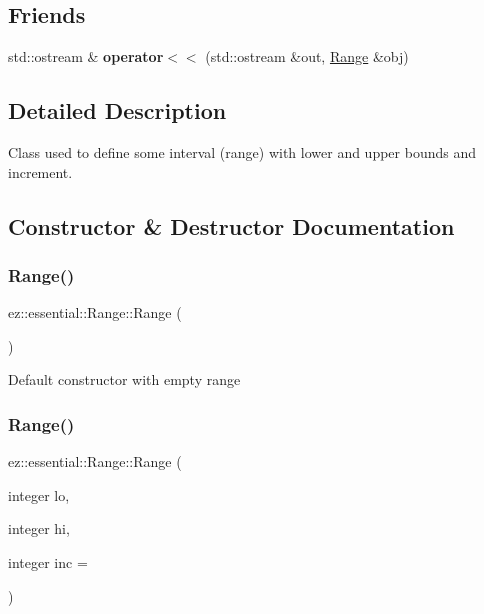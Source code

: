 \subsection*{Friends}
\begin{DoxyCompactItemize}
\item 
\mbox{\label{classez_1_1essential_1_1Range_a55300c5f660a81fcaf9da6c888573913}} 
std\+::ostream \& {\bfseries operator$<$$<$} (std\+::ostream \&out, \hyperlink{classez_1_1essential_1_1Range}{Range} \&obj)
\end{DoxyCompactItemize}


\subsection{Detailed Description}
Class used to define some interval (range) with lower and upper bounds and increment. 

\subsection{Constructor \& Destructor Documentation}
\mbox{\label{classez_1_1essential_1_1Range_ae594ee2956dd1baf07e78d988a51da29}} 
\subsubsection{\texorpdfstring{Range()}{Range()}\hspace{0.1cm}{\footnotesize\ttfamily [1/3]}}
{\footnotesize\ttfamily ez\+::essential\+::\+Range\+::\+Range (\begin{DoxyParamCaption}{ }\end{DoxyParamCaption})\hspace{0.3cm}{\ttfamily [inline]}}

Default constructor with empty range \mbox{\label{classez_1_1essential_1_1Range_ac13f4357a3e32efad65877d279edcb41}} 
\subsubsection{\texorpdfstring{Range()}{Range()}\hspace{0.1cm}{\footnotesize\ttfamily [2/3]}}
{\footnotesize\ttfamily ez\+::essential\+::\+Range\+::\+Range (\begin{DoxyParamCaption}\item[{integer}]{lo,  }\item[{integer}]{hi,  }\item[{integer}]{inc = {} }\end{DoxyParamCaption})\hspace{0.3cm}{\ttfamily [inline]}}

